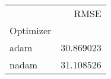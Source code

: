 \begin{tabular}{lr}
\toprule
 & RMSE \\
Optimizer &  \\
\midrule
adam & 30.869023 \\
nadam & 31.108526 \\
\bottomrule
\end{tabular}
